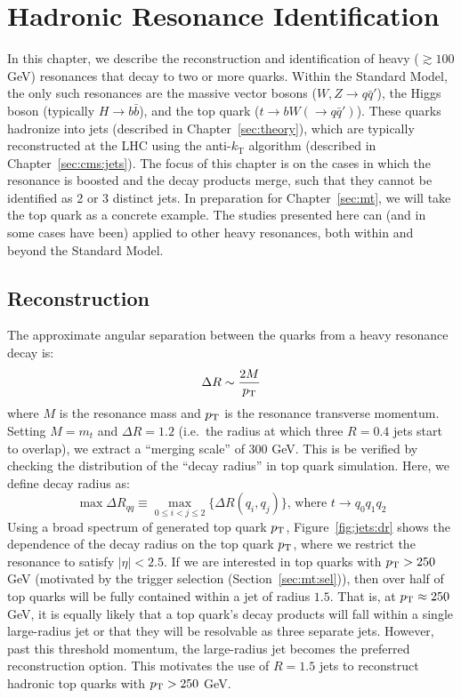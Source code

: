 \chapter{Hadronic Resonance Identification}
\label{sec:jets}

In this chapter, we describe the reconstruction and identification of heavy ($\gtrsim 100$ GeV) resonances that decay to two or more quarks.
Within the Standard Model, the only such resonances are the massive vector bosons ($W,Z\rightarrow q\bar{q}'$), the Higgs boson (typically $H\rightarrow b\bar{b}$), and the top quark ($t\rightarrow bW(\rightarrow q\bar{q}')$).
These quarks hadronize into jets (described in Chapter~\ref{sec:theory}), which are typically reconstructed at the LHC using the anti-$k_\mathrm{T}$ algorithm (described in Chapter~\ref{sec:cms:jets}).
The focus of this chapter is on the cases in which the resonance is boosted and the decay products merge, such that they cannot be identified as 2 or 3 distinct jets.
In preparation for Chapter~\ref{sec:mt}, we will take the top quark as a concrete example.
The studies presented here can (and in some cases have been) applied to other heavy resonances, both within and beyond the Standard Model.

\section{Reconstruction}
\label{sec:jets:reco}

The approximate angular separation between the quarks from a heavy resonance decay is\needcite:
\begin{equation}
    \Delta R \sim \frac{2M}{p_\mathrm{T}}
\end{equation}
where $M$ is the resonance mass and $p_\mathrm{T}$ is the resonance transverse momentum.
Setting $M=m_t$ and $\Delta R=1.2$ (i.e.~the radius at which three $R=0.4$ jets start to overlap), we extract a ``merging scale'' of $300$ GeV.  
This is be verified by checking the distribution of the ``decay radius'' in top quark simulation.
Here, we define decay radius as: 
\begin{equation}
    \max\Delta R_{qq} \equiv \displaystyle\max_{0\leq i < j \leq 2} \{\Delta R(q_i,q_j)\} \text{, where } t\rightarrow q_0q_1q_2
\end{equation}
Using a broad spectrum of generated top quark $p_\mathrm{T}$, Figure~\ref{fig:jets:dr} shows the dependence of the decay radius on the top quark $p_\mathrm{T}$, where we restrict the resonance to satisfy $|\eta|<2.5$.
If we are interested in top quarks with $p_\mathrm{T}>250$ GeV (motivated by the trigger selection (Section~\ref{sec:mt:sel})), then over half of top quarks will be fully contained within a jet of radius $1.5$.
That is, at $p_\mathrm{T}\approx 250$ GeV, it is equally likely that a top quark's decay products will fall within a single large-radius jet or that they will be resolvable as three separate jets. 
However, past this threshold momentum, the large-radius jet becomes the preferred reconstruction option.
This motivates the use of $R=1.5$ jets to reconstruct hadronic top quarks with $p_\mathrm{T}>250$ GeV. 

